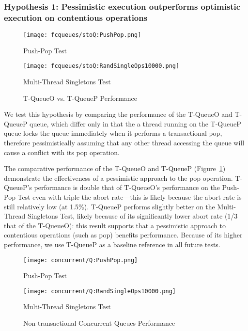 \subsubsection{Hypothesis 1: Pessimistic execution outperforms optimistic execution on contentious operations}
\begin{figure}[t]
    \centering
	\begin{minipage}{0.45\textwidth}
	    \texttt{[image: fcqueues/stoQ:PushPop.png]}
        \caption*{Push-Pop Test}
	\end{minipage}
	\begin{minipage}{0.45\textwidth}
	    \texttt{[image: fcqueues/stoQ:RandSingleOps10000.png]}
        \caption*{Multi-Thread Singletons Test}
	\end{minipage}
    \caption{T-QueueO vs. T-QueueP Performance}
    \label{fig:stoqs}
\end{figure}


We test this hypothesis by comparing the performance of the T-QueueO and T-QueueP queue, which differ only in that the a thread running on the T-QueueP queue locks the queue immediately when it performs a transactional pop, therefore pessimistically assuming that any other thread accessing the queue will cause a conflict with its pop operation.

The comparative performance of the T-QueueO and T-QueueP (Figure~\ref{fig:stoqs}) demonstrate the effectiveness of a pessimistic approach to the pop operation. T-QueueP's performance is double that of T-QueueO's performance on the Push-Pop Test even with triple the abort rate---this is likely because the abort rate is still relatively low (at 1.5\%). T-QueueP performs slightly better on the Multi-Thread Singletons Test, likely because of its significantly lower abort rate (1/3 that of the T-QueueO): this result supports that a pessimistic approach to contentious operations (such as pop) benefits performance. Because of its higher performance, we use T-QueueP as a baseline reference in all future tests.

\vspace{12pt}
\noindent{}

\begin{figure}[t]
    \centering
	\begin{minipage}{0.45\textwidth}
	    \texttt{[image: concurrent/Q:PushPop.png]}
        \caption*{Push-Pop Test}
	\end{minipage}
   	\begin{minipage}{0.45\textwidth}
	    \texttt{[image: concurrent/Q:RandSingleOps10000.png]}
        \caption*{Multi-Thread Singletons Test}
	\end{minipage}
        \caption{Non-transactional Concurrent Queues Performance}
    \label{fig:ntqs}
\end{figure}

